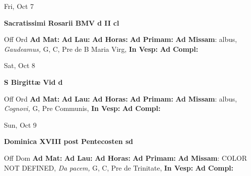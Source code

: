 \documentclass[10pt]{book}
\begin{document}
\begin{center}
\begin{minipage}{3.5in}
\vspace{2em}
\begin{center}Fri, Oct 7
\end{center}
\textbf{ \large Sacratissimi Rosarii BMV
\textnormal{\normalsize d II cl}}

\begin{justify}Off Ord
\textbf{Ad Mat: }
\textbf{Ad Lau: }
\textbf{Ad Horas: }
\textbf{Ad Primam: }\textbf{Ad Missam}: albus, \textit{Gaudeamus,} G, C, Pre de B Maria Virg, 
\textbf{In Vesp: }
\textbf{Ad Compl: }
\end{justify}
\end{minipage}
\end{center}

\begin{center}
\begin{minipage}{3.5in}
\vspace{2em}
\begin{center}Sat, Oct 8
\end{center}
\textbf{ \large S Birgittæ Vid
\textnormal{\normalsize d}}

\begin{justify}Off Ord
\textbf{Ad Mat: }
\textbf{Ad Lau: }
\textbf{Ad Horas: }
\textbf{Ad Primam: }\textbf{Ad Missam}: albus, \textit{Cognovi,} G, Pre Communis, 
\textbf{In Vesp: }
\textbf{Ad Compl: }
\end{justify}
\end{minipage}
\end{center}

\begin{center}
\begin{minipage}{3.5in}
\vspace{2em}
\begin{center}Sun, Oct 9
\end{center}
\textbf{ \large Dominica XVIII post Pentecosten
\textnormal{\normalsize sd}}

\begin{justify}Off Dom
\textbf{Ad Mat: }
\textbf{Ad Lau: }
\textbf{Ad Horas: }
\textbf{Ad Primam: }\textbf{Ad Missam}: COLOR NOT DEFINED, \textit{Da pacem,} G, C, Pre de Trinitate, 
\textbf{In Vesp: }
\textbf{Ad Compl: }
\end{justify}
\end{minipage}
\end{center}
\end{document}
